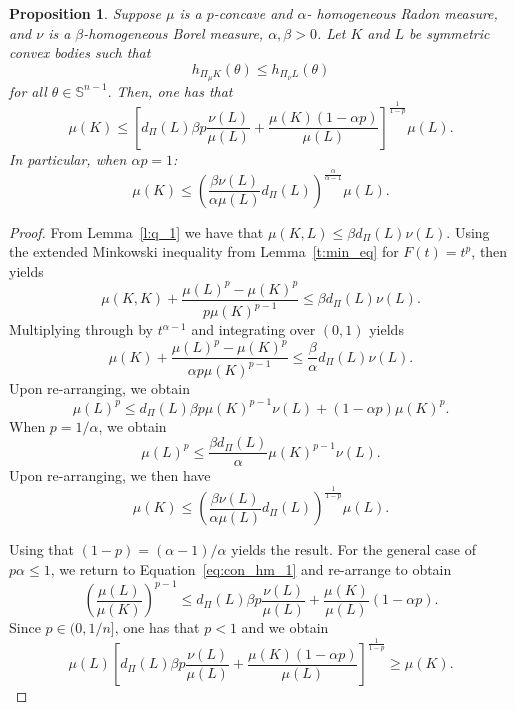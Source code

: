 \documentclass[11pt]{amsart}
\newtheorem{proposition}[theorem]{Proposition}
\theoremstyle{definition}
\theoremstyle{remark}
\numberwithin{equation}{section}
\newcommand{\s}{\mathbb{S}}
\begin{document}
\begin{proposition}
\label{p:q_4}
Suppose $\mu$ is a $p$-concave and $\alpha$- homogeneous Radon measure, and $\nu$ is a $\beta$-homogeneous Borel measure, $\alpha,\beta > 0$. Let $K$ and $L$ be symmetric convex bodies such that
$$h_{\Pi_\mu K}(\theta)\leq h_{\Pi_\nu L}(\theta)$$ for all $\theta\in\s^{n-1}.$ Then, one has that
$$\mu(K) \leq \left[d_{\Pi}(L)\beta p\frac{\nu(L)}{\mu(L)} +\frac{\mu(K)(1-\alpha p)}{\mu(L)}\right]^{\frac{1}{1-p}} \mu(L).$$
In particular, when $\alpha p=1$:
$$\mu(K) \leq \left(\frac{\beta\nu(L)}{\alpha\mu(L)}d_{\Pi}(L)\right)^{\frac{\alpha}{\alpha-1}}\mu(L).$$
\end{proposition}
\begin{proof}
From Lemma~\ref{l:q_1} we have that $\mu(K,L) \leq \beta d_{\Pi}(L)\nu(L).$ Using the extended Minkowski inequality from Lemma~\ref{t:min_eq} for $F(t)=t^p$, then yields
$$\mu(K,K)+\frac{\mu(L)^p-\mu(K)^p}{p\mu(K)^{p-1}}\leq \beta d_{\Pi}(L)\nu(L).$$
Multiplying through by $t^{\alpha-1}$ and integrating over $(0,1)$ yields
$$\mu(K)+\frac{\mu(L)^p-\mu(K)^p}{\alpha p\mu(K)^{p-1}}\leq \frac{\beta}{\alpha} d_{\Pi}(L)\nu(L).$$
Upon re-arranging, we obtain
\begin{equation}
\label{eq:con_hm_1}
\mu(L)^p \leq d_{\Pi}(L)\beta p \mu(K)^{p-1}\nu(L) +(1-\alpha p)\mu(K)^p .
\end{equation}
When $p=1/\alpha$, we obtain
$$\mu(L)^p \leq \frac{\beta d_{\Pi}(L)}{\alpha} \mu(K)^{p-1}\nu(L).$$
Upon re-arranging, we then have
$$\mu(K) \leq \left(\frac{\beta\nu(L)}{\alpha\mu(L)}d_{\Pi}(L)\right)^{\frac{1}{1-p}}\mu(L).$$

Using that $(1-p)=(\alpha-1)/\alpha$ yields the result. For the general case of $p\alpha\leq 1$, we return to Equation~\ref{eq:con_hm_1} and re-arrange to obtain
$$\left(\frac{\mu(L)}{\mu(K)}\right)^{p-1} \leq d_{\Pi}(L)\beta p\frac{\nu(L)}{\mu(L)} +\frac{\mu(K)}{\mu(L)}(1-\alpha p).$$
Since $p\in(0,1/n]$, one has that $p<1$ and we obtain
$$\mu(L) \left[d_{\Pi}(L)\beta p\frac{\nu(L)}{\mu(L)} +\frac{\mu(K)(1-\alpha p)}{\mu(L)}\right]^{\frac{1}{1-p}} \geq \mu(K).$$
\end{proof}
\end{document}

